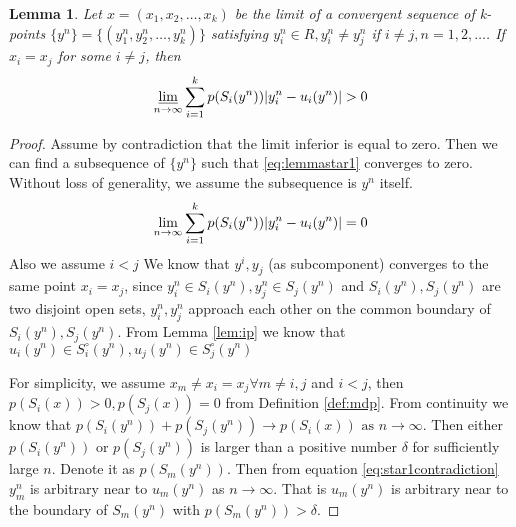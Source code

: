 \documentclass{article}
\newtheorem{lemma}{Lemma}
\theoremstyle{definition}
\DeclarePairedDelimiter\abs{\lvert}{\rvert}
\begin{document}
\begin{lemma}
Let $x=(x_1,x_2,\dots,x_k) $ be the limit of a convergent sequence of k-points $\{y^n\} =\{ (y_1^n, y_2^n,\dots, y_k^n) \}$ satisfying $y_i^n \in R, y_i^n \neq y_j^n $ if $ i \neq  j, n = 1, 2, \dots $. If $x_i = x_j $ for some $ i \neq j $, then 
\begin{equation}\label{eq:lemmastar1}
\varliminf_{n\to \infty} \sum_{i=1}^k p(S_i(y^n)) \abs{y_i^n - u_i(y^n)} >0
\end{equation}
\end{lemma}
\begin{proof}
Assume by contradiction that the limit inferior is equal to zero.  Then we can find a subsequence of $\{ y^n \}$ such that \eqref{eq:lemmastar1} converges to zero. Without loss of generality, we assume the subsequence is $y^n$ itself. 
\begin{equation}\label{eq:star1contradiction}
\lim_{n\to \infty} \sum_{i=1}^k p(S_i(y^n)) \abs{y_i^n - u_i(y^n)} =0
\end{equation}
Also we assume $i < j$
We know that $y^i,y_j$ (as subcomponent) converges to the same point $x_i = x_j$,
since $y_i^n \in S_i(y^n), y_j^n \in S_j(y^n)$ and $S_i(y^n), S_j(y^n)$ are two disjoint open sets,
$y^n_i, y^n_j$ approach each other on the common boundary of $S_i(y^n), S_j(y^n)$.
From Lemma \ref{lem:ip} we know that $u_i(y^n) \in S_i^{\circ}(y^n),u_j(y^n) \in S_j^{\circ}(y^n)$

For simplicity, we assume $x_m \neq x_i = x_j \forall m\neq i,j$ and $i<j$, then $p(S_i(x))>0, p(S_j(x))=0$ from Definition \ref{def:mdp}.
From continuity we know that $p(S_i(y^n))+p(S_j(y^n)) \to p(S_i(x)) \textrm{ as } n\to \infty$. Then either $p(S_i(y^n))$ or $p(S_j(y^n))$ is larger than a positive number $\delta$ for sufficiently large $n$.  Denote it as $p(S_m(y^n))$. Then from equation \eqref{eq:star1contradiction} $y_m^n $ is arbitrary near to $u_m(y^n)$ as $ n \to \infty$. That is $u_m(y^n)$ is arbitrary near to the boundary of $S_m(y^n)$ with $p(S_m(y^n))>\delta $.

\end{proof}
\end{document}
